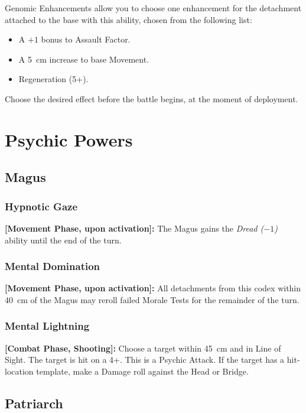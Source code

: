 Genomic Enhancements allow you to choose one enhancement for the detachment attached to the base with this ability, chosen from the following list:

\begin{itemize}
    \item A $+1$ bonus to Assault Factor.
    \item A 5~cm increase to base Movement.
    \item Regeneration (5+).
\end{itemize}

Choose the desired effect before the battle begins, at the moment of deployment.

\section{Psychic Powers}

\subsection{Magus}

\subsubsection{Hypnotic Gaze}

\textbf{[Movement Phase, upon activation]:} The Magus gains the \textit{Dread ($-1$)} ability until the end of the turn.

\subsubsection{Mental Domination}

\textbf{[Movement Phase, upon activation]:} All detachments from this codex within 40~cm of the Magus may reroll failed Morale Tests for the remainder of the turn.

\subsubsection{Mental Lightning}

\textbf{[Combat Phase, Shooting]:} Choose a target within 45~cm and in Line of Sight. The target is hit on a 4+. This is a Psychic Attack. If the target has a hit-location template, make a Damage roll against the Head or Bridge.

\subsection{Patriarch}

